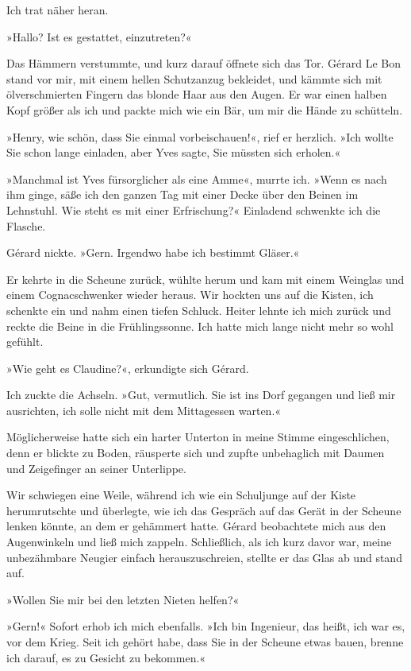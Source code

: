 Ich trat näher heran.

»Hallo? Ist es gestattet, einzutreten?«

Das Hämmern verstummte, und kurz darauf öffnete sich das Tor.
Gérard Le Bon stand vor mir, mit einem hellen Schutzanzug
bekleidet, und kämmte sich mit ölverschmierten Fingern das blonde
Haar aus den Augen. Er war einen halben Kopf größer als ich und
packte mich wie ein Bär, um mir die Hände zu schütteln.

»Henry, wie schön, dass Sie einmal vorbeischauen!«, rief er
herzlich. »Ich wollte Sie schon lange einladen, aber Yves sagte,
Sie müssten sich erholen.«

»Manchmal ist Yves fürsorglicher als eine Amme«, murrte ich. »Wenn
es nach ihm ginge, säße ich den ganzen Tag mit einer Decke über den
Beinen im Lehnstuhl. Wie steht es mit einer Erfrischung?« Einladend
schwenkte ich die Flasche.

Gérard nickte. »Gern. Irgendwo habe ich bestimmt Gläser.«

Er kehrte in die Scheune zurück, wühlte herum und kam mit einem
Weinglas und einem Cognacschwenker wieder heraus. Wir hockten uns
auf die Kisten, ich schenkte ein und nahm einen tiefen Schluck.
Heiter lehnte ich mich zurück und reckte die Beine in die
Frühlingssonne. Ich hatte mich lange nicht mehr so wohl gefühlt.

»Wie geht es Claudine?«, erkundigte sich Gérard.

Ich zuckte die Achseln. »Gut, vermutlich. Sie ist ins Dorf gegangen
und ließ mir ausrichten, ich solle nicht mit dem Mittagessen
warten.«

Möglicherweise hatte sich ein harter Unterton in meine Stimme
eingeschlichen, denn er blickte zu Boden, räusperte sich und zupfte
unbehaglich mit Daumen und Zeigefinger an seiner Unterlippe.

Wir schwiegen eine Weile, während ich wie ein Schuljunge auf der
Kiste herumrutschte und überlegte, wie ich das Gespräch auf das
Gerät in der Scheune lenken könnte, an dem er gehämmert hatte.
Gérard beobachtete mich aus den Augenwinkeln und ließ mich zappeln.
Schließlich, als ich kurz davor war, meine unbezähmbare Neugier
einfach herauszuschreien, stellte er das Glas ab und stand auf.

»Wollen Sie mir bei den letzten Nieten helfen?«

»Gern!« Sofort erhob ich mich ebenfalls. »Ich bin Ingenieur, das
heißt, ich war es, vor dem Krieg. Seit ich gehört habe, dass Sie in
der Scheune etwas bauen, brenne ich darauf, es zu Gesicht zu
bekommen.«

